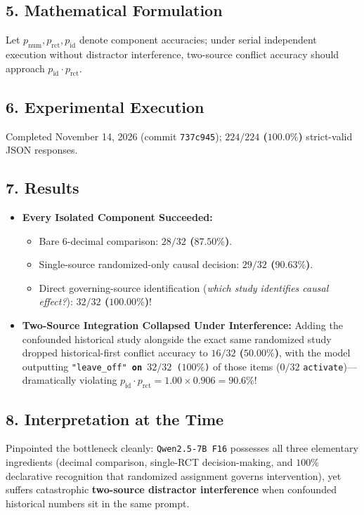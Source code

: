 \subsection*{5. Mathematical Formulation}
Let $p_{\mathrm{num}}, p_{\mathrm{rct}}, p_{\mathrm{id}}$ denote component accuracies; under serial independent execution without distractor interference, two-source conflict accuracy should approach $p_{\mathrm{id}} \cdot p_{\mathrm{rct}}$.

\subsection*{6. Experimental Execution}
Completed November 14, 2026 (commit \texttt{737c945}); \textbf{$224/224$ ($100.0\%$)} strict-valid JSON responses.

\subsection*{7. Results}
\begin{itemize}
  \item \textbf{Every Isolated Component Succeeded:}
    \begin{itemize}
      \item Bare 6-decimal comparison: \textbf{$28/32$ ($87.50\%$)}.
      \item Single-source randomized-only causal decision: \textbf{$29/32$ ($90.63\%$)}.
      \item Direct governing-source identification (\emph{which study identifies causal effect?}): \textbf{$32/32$ ($100.00\%$)}!
    \end{itemize}
  \item \textbf{Two-Source Integration Collapsed Under Interference:} Adding the confounded historical study alongside the exact same randomized study dropped historical-first conflict accuracy to \textbf{$16/32$ ($50.00\%$)}, with the model outputting \texttt{"leave\_off"\textbf{ on }$32/32$ ($100\%$)} of those items ($0/32$ \texttt{activate})---dramatically violating $p_{\mathrm{id}}\cdot p_{\mathrm{rct}} = 1.00 \times 0.906 = 90.6\%$!
\end{itemize}

\subsection*{8. Interpretation at the Time}
Pinpointed the bottleneck cleanly: \texttt{Qwen2.5-7B F16} possesses all three elementary ingredients (decimal comparison, single-RCT decision-making, and $100\%$ declarative recognition that randomized assignment governs intervention), yet suffers catastrophic \textbf{two-source distractor interference} when confounded historical numbers sit in the same prompt.

